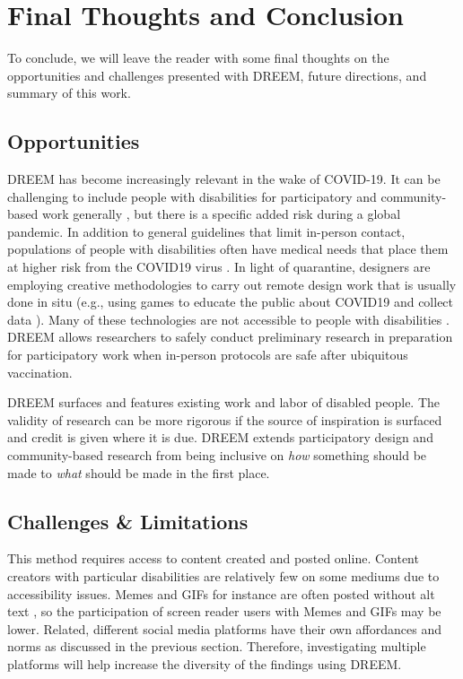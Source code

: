 \section{Final Thoughts and Conclusion} \label{Discussion}
To conclude, we will leave the reader with some final thoughts on the opportunities and challenges presented with DREEM, future directions, and summary of this work.

\subsection{Opportunities}
DREEM has become increasingly relevant in the wake of COVID-19. It can be challenging to include people with disabilities for participatory and community-based work generally \cite{wardReflectionsParticipatoryAction2001}, but there is a specific added risk during a global pandemic. In addition to general guidelines that limit in-person contact, populations of people with disabilities often have medical needs that place them at higher risk from the COVID19 virus \cite{armitageCOVID19ResponseMust2020}. In light of quarantine, designers are employing creative methodologies to carry out remote design work that is usually done in situ \cite{whiteLearningCOVID19Design2020} (e.g., using games to educate the public about COVID19 and collect data \cite{lopezherna;ndezHealthcareGamificationSerious2020}). Many of these technologies are not accessible to people with disabilities \cite{annaswamyTelemedicineBarriersChallenges2020}. DREEM allows researchers to safely conduct preliminary research in preparation for participatory work when in-person protocols are safe after ubiquitous vaccination. 

DREEM surfaces and features existing work and labor of disabled people. The validity of research can be more rigorous if the source of inspiration is surfaced and credit is given where it is due. DREEM extends participatory design and community-based research from being inclusive on \textit{how} something should be made to \textit{what} should be made in the first place.

\subsection{Challenges \& Limitations}
This method requires access to content created and posted online. Content creators with particular disabilities are relatively few on some mediums due to accessibility issues. Memes and GIFs for instance are often posted without alt text \cite{gleasonMakingGIFsAccessible2020}, so the participation of screen reader users with Memes and GIFs may be lower. Related, different social media platforms have their own affordances and norms as discussed in the previous section. Therefore, investigating multiple platforms will help increase the diversity of the findings using DREEM.

